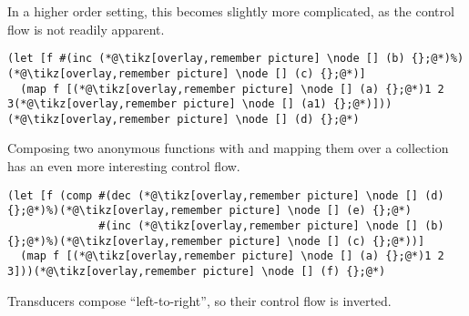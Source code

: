 \documentclass[9pt]{extarticle}
\begin{document}
In a higher order setting, this becomes slightly more complicated, as
the control flow is not readily apparent.

\begin{lstlisting}
(let [f #(inc (*@\tikz[overlay,remember picture] \node [] (b) {};@*)%)(*@\tikz[overlay,remember picture] \node [] (c) {};@*)]
  (map f [(*@\tikz[overlay,remember picture] \node [] (a) {};@*)1 2 3(*@\tikz[overlay,remember picture] \node [] (a1) {};@*)]))(*@\tikz[overlay,remember picture] \node [] (d) {};@*)
\end{lstlisting}

Composing two anonymous functions with  and mapping
them over a collection has an even more interesting control flow.

\begin{lstlisting}
(let [f (comp #(dec (*@\tikz[overlay,remember picture] \node [] (d) {};@*)%)(*@\tikz[overlay,remember picture] \node [] (e) {};@*)
              #(inc (*@\tikz[overlay,remember picture] \node [] (b) {};@*)%)(*@\tikz[overlay,remember picture] \node [] (c) {};@*))]
  (map f [(*@\tikz[overlay,remember picture] \node [] (a) {};@*)1 2 3]))(*@\tikz[overlay,remember picture] \node [] (f) {};@*)
\end{lstlisting}

%

Transducers compose ``left-to-right'', so their control flow is inverted.
\end{document}
